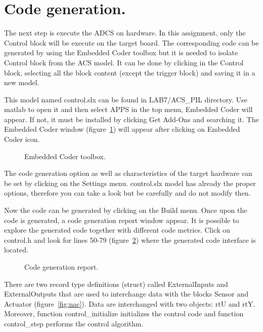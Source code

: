 \section{Code generation.}

The next step is execute the ADCS on hardware. In this assignment, only the Control block will be execute on the target board.
The corresponding code can be generated by using the Embedded Coder toolbox but it is needed to isolate Control block from the ACS model. It can be done by clicking in the Control block, selecting all the block content (except the trigger block) and saving it in a new model. 

This model named control.slx can be found in LAB7/ACS\_PIL directory. Use matlab to open it and then select APPS in the top menu, Embedded Coder will appear. If not, it must be installed by clicking Get Add-Ons and searching it. The Embedded Coder window (figure~\ref{fig:control}) will appear after clicking on Embedded Coder icon.

\begin{figure}[h]
            \caption{Embedded Coder toolbox.}

            \label{fig:control}
\end{figure}

The code generation option as well as characteristics of the target hardware can be set by clicking on the Settings menu. control.slx model has already the proper options, therefore you can take a look but be carefully and do not modify then.

Now the code can be generated by clicking on the Build menu. Once upon the code is generated, a code generation report window appear. It is possible to explore the generated code together with different code metrics. Click on control.h and look for lines 50-79 (figure~\ref{fig:code}) where the generated code interface is located.

\begin{figure}[h]
            \caption{Code generation report.}

            \label{fig:code}
\end{figure}

There are two record type definitions (struct) called ExternalInputs and ExternalOutputs that are used to interchange data with the blocks Sensor and Actuator (figure~\ref{fig:nac}). Data are interchanged with two objects: rtU and rtY.
Moreover, function control\_initialize initializes the control code and function control\_step performs the control algorithm.

